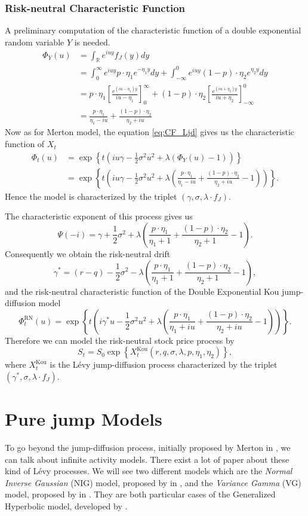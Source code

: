 \subsubsection*{Risk-neutral Characteristic Function}
A preliminary computation of the characteristic function of a double exponential random variable $Y$ is needed.
\begin{align*}
\Phi_Y(u)&=\int_\mathbb{R} e^{iuy}f_J(y) dy\\
&=\int_0^\infty e^{iuy}p\cdot \eta_1e^{-\eta_1 y}dy + \int_{-\infty}^0e^{iuy}(1-p)\cdot\eta_2e^{\eta_2 y}dy\\
&= p\cdot\eta_1\left[\frac{e^{(iu-\eta_1)y}}{iu-\eta_1}\right]_0^\infty+(1-p)\cdot\eta_2\left[\frac{e^{(iu+\eta_2)y}}{iu+\eta_2}\right]_{-\infty}^0\\
&=\frac{p\cdot\eta_1}{\eta_1-iu}+\frac{(1-p)\cdot\eta_2}{\eta_2+iu}
\end{align*}
Now as for Merton model, the equation \eqref{eq:CF_Ljd} gives us the characteristic function of $X_t$
\begin{align*}
\Phi_t(u)&=\exp\left\{t\left(iu\gamma-\frac{1}{2}\sigma^2 u^2 + \lambda\left(\Phi_Y(u)-1\right)\right)\right\}\\
&=\exp\left\{t\left(iu\gamma -\frac{1}{2}\sigma^2u^2 + \lambda\left(\frac{p\cdot\eta_1}{\eta_1-iu}+\frac{(1-p)\cdot\eta_2}{\eta_2+iu}-1\right)\right)\right\}.
\end{align*}
Hence the model is characterized by the triplet $(\gamma,\sigma,\lambda\cdot f_J)$.

The characteristic exponent of this process gives us
$$\Psi(-i) = \gamma + \frac{1}{2}\sigma^2 +\lambda \left(\frac{p\cdot\eta_1}{\eta_1+1}+\frac{(1-p)\cdot\eta_2}{\eta_2+1}-1\right).$$
Consequently we obtain the risk-neutral drift
$$\gamma^\ast = (r-q)- \frac{1}{2}\sigma^2 -\lambda \left(\frac{p\cdot\eta_1}{\eta_1+1}+\frac{(1-p)\cdot\eta_2}{\eta_2+1}-1\right),$$
and the risk-neutral characteristic function of the Double Exponential Kou jump-diffusion model
$$\Phi_t^\text{RN}(u)=\exp\left\{t\left(i\gamma^\ast u -\frac{1}{2}\sigma^2 u^2 +\lambda\left(\frac{p\cdot\eta_1}{\eta_1+iu}+\frac{(1-p)\cdot\eta_2}{\eta_2+iu}-1\right)\right)\right\}.$$
Therefore we can model the risk-neutral stock price process by
$$S_t=S_0\exp\left\{X_t^\text{Kou}(r,q,\sigma,\lambda,p,\eta_1,\eta_2)\right\},$$
where $X_t^\text{Kou}$ is the L\'evy jump-diffusion process characterized by the triplet $(\gamma^\ast,\sigma,\lambda\cdot f_J)$.

\section{Pure jump Models}
\label{sec:models:pure_jump}
To go beyond the jump-diffusion process, initially proposed by Merton in \citeyear{Mer76}, we can talk about infinite activity models. There exist a lot of paper about these kind of L\'evy processes. We will see two different models which are the \textit{Normal Inverse Gaussian} (NIG) model, proposed by \citeauthor{Bar97b} in \citeyear{Bar97b}, and the \textit{Variance Gamma} (VG) model, proposed by \citeauthor{MCC98} in \citeyear{MCC98}. They are both particular cases of the Generalized Hyperbolic model, developed by \citeauthor{EP98} \citeyearpar{EP98}.

